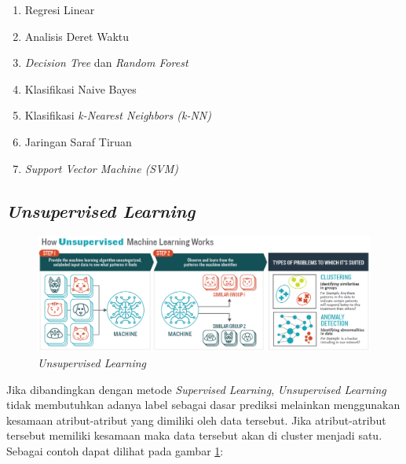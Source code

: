     \begin{enumerate}[nolistsep]
      
      \item Regresi Linear

      \item Analisis Deret Waktu

      \item \textit{Decision Tree} dan \textit{Random Forest}

      \item Klasifikasi Naive Bayes

      \item Klasifikasi \textit{k-Nearest Neighbors (k-NN)}

      \item Jaringan Saraf Tiruan

      \item \textit{Support Vector Machine (SVM)}

    \end{enumerate}

  \subsection{\textit{Unsupervised Learning}}

    \begin{figure}[hbt!] \centering
      \includegraphics[scale=0.3]{gambar/unsupervised.png}
      \caption{\textit{Unsupervised Learning} \cite{booz}}
      \label{fig:unsupervisedLearning}
    \end{figure}

  Jika dibandingkan dengan metode \textit{Supervised Learning}, \textit{Unsupervised Learning} tidak membutuhkan adanya label sebagai dasar prediksi melainkan menggunakan kesamaan atribut-atribut yang dimiliki oleh data tersebut.
  Jika atribut-atribut tersebut memiliki kesamaan maka data tersebut akan di cluster menjadi satu.
  Sebagai contoh dapat dilihat pada gambar \ref{fig:unsupervisedLearning}:

